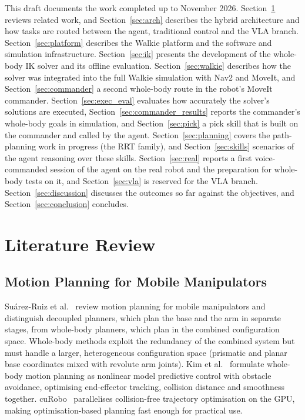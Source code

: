 \documentclass[12pt,a4paper]{article}
\begin{document}
This draft documents the work completed up to November 2026. Section~\ref{sec:lit} reviews related
work, and Section~\ref{sec:arch} describes the hybrid architecture and how tasks are routed between
the agent, traditional control and the VLA branch. Section~\ref{sec:platform} describes the Walkie
platform and the software and simulation infrastructure. Section~\ref{sec:ik} presents the
development of the whole-body IK solver and its offline evaluation. Section~\ref{sec:walkie}
describes how the solver was integrated into the full Walkie simulation with Nav2 and MoveIt, and
Section~\ref{sec:commander} a second whole-body route in the robot's MoveIt commander.
Section~\ref{sec:exec_eval} evaluates how accurately the solver's solutions are executed,
Section~\ref{sec:commander_results} reports the commander's whole-body goals in simulation, and
Section~\ref{sec:pick} a pick skill that is built on the commander and called by the agent.
Section~\ref{sec:planning} covers the path-planning work in progress (the RRT family), and
Section~\ref{sec:skills} scenarios of the agent reasoning over these skills. Section~\ref{sec:real}
reports a first voice-commanded session of the agent on the real robot and the preparation for
whole-body tests on it, and Section~\ref{sec:vla} is reserved for the VLA branch.
Section~\ref{sec:discussion} discusses the outcomes so far against the objectives, and
Section~\ref{sec:conclusion} concludes.

\section{Literature Review}
\label{sec:lit}

\subsection{Motion Planning for Mobile Manipulators}

Su\'arez-Ruiz et al.~\cite{suarezruiz2022} review motion planning for mobile manipulators and
distinguish decoupled planners, which plan the base and the arm in separate stages, from
whole-body planners, which plan in the combined configuration space. Whole-body methods exploit
the redundancy of the combined system but must handle a larger, heterogeneous configuration
space (prismatic and planar base coordinates mixed with revolute arm joints). Kim et
al.~\cite{kim2022nmpc} formulate whole-body motion planning as nonlinear model predictive control
with obstacle avoidance, optimising end-effector tracking, collision distance and smoothness
together. cuRobo~\cite{sundaralingam2023curobo} parallelises collision-free trajectory
optimisation on the GPU, making optimisation-based planning fast enough for practical use.
\end{document}
